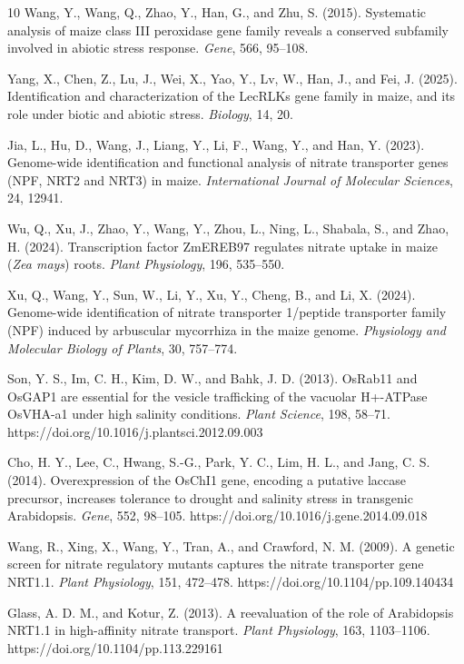 \documentclass[unnumsec,webpdf,contemporary,large]{oup-authoring-template}%
\theoremstyle{thmstyleone}%
\theoremstyle{thmstyletwo}%
\theoremstyle{thmstylethree}%
\begin{document}
\begin{thebibliography}{10}
Wang, Y., Wang, Q., Zhao, Y., Han, G., and Zhu, S. (2015).
Systematic analysis of maize class III peroxidase gene family reveals a conserved subfamily involved in abiotic stress response.
\textit{Gene}, 566, 95--108.

Yang, X., Chen, Z., Lu, J., Wei, X., Yao, Y., Lv, W., Han, J., and Fei, J. (2025).
Identification and characterization of the LecRLKs gene family in maize, and its role under biotic and abiotic stress.
\textit{Biology}, 14, 20.

Jia, L., Hu, D., Wang, J., Liang, Y., Li, F., Wang, Y., and Han, Y. (2023).
Genome-wide identification and functional analysis of nitrate transporter genes (NPF, NRT2 and NRT3) in maize.
\textit{International Journal of Molecular Sciences}, 24, 12941.

Wu, Q., Xu, J., Zhao, Y., Wang, Y., Zhou, L., Ning, L., Shabala, S., and Zhao, H. (2024).
Transcription factor ZmEREB97 regulates nitrate uptake in maize (\textit{Zea mays}) roots.
\textit{Plant Physiology}, 196, 535--550.

Xu, Q., Wang, Y., Sun, W., Li, Y., Xu, Y., Cheng, B., and Li, X. (2024).
Genome-wide identification of nitrate transporter 1/peptide transporter family (NPF) induced by arbuscular mycorrhiza in the maize genome.
\textit{Physiology and Molecular Biology of Plants}, 30, 757--774.

Son, Y. S., Im, C. H., Kim, D. W., and Bahk, J. D. (2013).
OsRab11 and OsGAP1 are essential for the vesicle trafficking of the vacuolar H+-ATPase OsVHA-a1 under high salinity conditions.
\textit{Plant Science}, 198, 58--71.
https://doi.org/10.1016/j.plantsci.2012.09.003

Cho, H. Y., Lee, C., Hwang, S.-G., Park, Y. C., Lim, H. L., and Jang, C. S. (2014).
Overexpression of the OsChI1 gene, encoding a putative laccase precursor, increases tolerance to drought and salinity stress in transgenic Arabidopsis.
\textit{Gene}, 552, 98--105.
https://doi.org/10.1016/j.gene.2014.09.018

Wang, R., Xing, X., Wang, Y., Tran, A., and Crawford, N. M. (2009).
A genetic screen for nitrate regulatory mutants captures the nitrate transporter gene NRT1.1.
\textit{Plant Physiology}, 151, 472--478.
https://doi.org/10.1104/pp.109.140434

Glass, A. D. M., and Kotur, Z. (2013).
A reevaluation of the role of Arabidopsis NRT1.1 in high-affinity nitrate transport.
\textit{Plant Physiology}, 163, 1103--1106.
https://doi.org/10.1104/pp.113.229161


\end{thebibliography}
\end{document}
